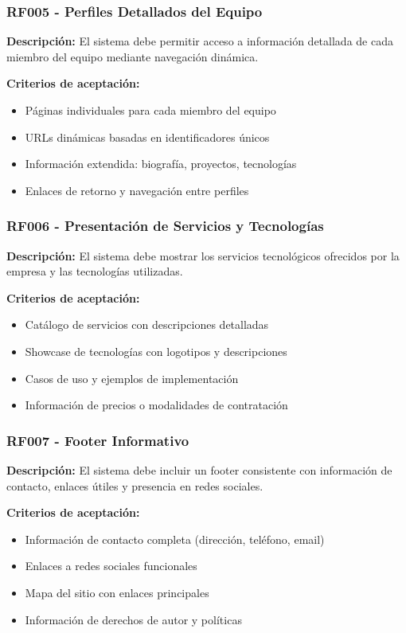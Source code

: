 \subsubsection{RF005 - Perfiles Detallados del Equipo}
\textbf{Descripción:} El sistema debe permitir acceso a información detallada de cada miembro del equipo mediante navegación dinámica.

\textbf{Criterios de aceptación:}
\begin{itemize}
    \item Páginas individuales para cada miembro del equipo
    \item URLs dinámicas basadas en identificadores únicos
    \item Información extendida: biografía, proyectos, tecnologías
    \item Enlaces de retorno y navegación entre perfiles
\end{itemize}

\subsubsection{RF006 - Presentación de Servicios y Tecnologías}
\textbf{Descripción:} El sistema debe mostrar los servicios tecnológicos ofrecidos por la empresa y las tecnologías utilizadas.

\textbf{Criterios de aceptación:}
\begin{itemize}
    \item Catálogo de servicios con descripciones detalladas
    \item Showcase de tecnologías con logotipos y descripciones
    \item Casos de uso y ejemplos de implementación
    \item Información de precios o modalidades de contratación
\end{itemize}

\subsubsection{RF007 - Footer Informativo}
\textbf{Descripción:} El sistema debe incluir un footer consistente con información de contacto, enlaces útiles y presencia en redes sociales.

\textbf{Criterios de aceptación:}
\begin{itemize}
    \item Información de contacto completa (dirección, teléfono, email)
    \item Enlaces a redes sociales funcionales
    \item Mapa del sitio con enlaces principales
    \item Información de derechos de autor y políticas
\end{itemize}

